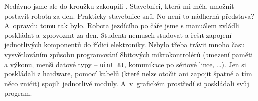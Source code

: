 Nedávno jsme ale do kroužku zakoupili \legoEV{}. 
Stavebnici, která mi měla umožnit postavit robota za den. 
Prakticky stavebnice snů. No není to nádherná představa?
A~opravdu tomu tak bylo. Robota jezdícího po čáře jsme s manuálem zvládli poskládat a~zprovoznit za den. 
Studenti nemuseli studovat a řešit zapojení jednotlivých komponentů do řídicí elektroniky. 
% 
% 
%
%
Nebylo třeba trávit mnoho času vysvětlováním způsobu programování 8bitových mikrokontrolérů (omezení paměti a výkonu, menší datové typy -- \verb|uint_8t|, komunikace po sériové lince, \dots).
% 
% 
%
%
%
%
% 
% 
%
%
% 
% 
%
%
Jen si poskládali z \lega{ }hardware, pomocí kabelů (které nelze otočit ani zapojit špatně a tím něco zničit) spojili jednotlivé moduly. 
% 
% 
%
%
%
%
A~v~grafickém prostředí si poskládali svůj program.

